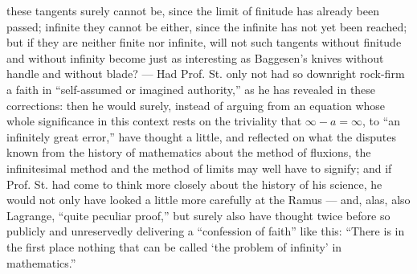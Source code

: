\documentclass[12pt,a4paper,openany]{book}
\newcommand{\opage}[1]{\marginnote{\footnotesize\textit{[#1]}}}
\begin{document}
\opage{47}\setcounter{footnote}{0}%
these tangents surely cannot be, since the limit of finitude
has already been passed; infinite they cannot be either,
since the infinite has not yet been reached; but if they are neither
finite nor infinite, will not such tangents without
finitude and without infinity become just as interesting
as Baggesen's knives without handle and without blade? --- Had
Prof. St. only not had so downright rock-firm a faith in
``self-assumed or imagined authority,'' as he has revealed in these
\opage{48}\setcounter{footnote}{0}%
corrections: then he would surely, instead of
arguing from an equation whose whole significance in this
context rests on the triviality that $\infty - a = \infty$,
to ``an infinitely great error,'' have thought a little, and reflected
on what the disputes known from the history of mathematics about the method of fluxions, the infinitesimal method and
the method of limits may well have to signify; and if
Prof. St. had come to think more closely about the history of
his science, he would not only have looked a little more
carefully at the Ramus --- and, alas, also Lagrange,
``quite peculiar proof,'' but surely also have thought
twice before so publicly and unreservedly
delivering a ``confession of faith'' like this: ``There is in the
first place nothing that can be called `the problem of infinity' in mathematics.''
\end{document}
